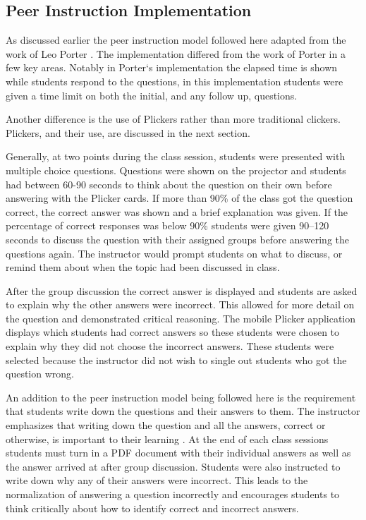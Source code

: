 \documentclass[12pt]{article}
\begin{document}

\subsection{Peer Instruction Implementation}

As discussed earlier the peer instruction model followed here adapted from the work of Leo Porter \cite{porterPeerInstructionStudents2011}. The implementation differed from the work of Porter in a few key areas. Notably in Porter`s implementation the elapsed time is shown while students respond to the questions, in this implementation students were given a time limit on both the initial, and any follow up, questions. 

Another difference is the use of Plickers rather than more traditional clickers. Plickers, and their use, are discussed in the next section.

Generally, at two points during the class session, students were presented with multiple choice questions. Questions were shown on the projector and students had between 60-90 seconds to think about the question on their own before answering with the Plicker cards. If more than 90\% of the class got the question correct, the correct answer was shown and a brief explanation was given. If the percentage of correct responses was below 90\% students were given 90–120 seconds to discuss the question with their assigned groups before answering the questions again. The instructor would prompt students on what to discuss, or remind them about when the topic had been discussed in class. 

After the group discussion the correct answer is displayed and students are asked to explain why the other answers were incorrect. This allowed for more detail on the question and demonstrated critical reasoning. The mobile Plicker application displays which students had correct answers so these students were chosen to explain why they did not choose the incorrect answers. These students were selected because the instructor did not wish to single out students who got the question wrong.

An addition to the peer instruction model being followed here is the requirement that students write down the questions and their answers to them. The instructor emphasizes that writing down the question and all the answers, correct or otherwise, is important to their learning \cite{metcalfeMemoryTruthCorrecting2019}. At the end of each class sessions students must turn in a PDF document with their individual answers as well as the answer arrived at after group discussion. Students were also instructed to write down why any of their answers were incorrect. This leads to the normalization of answering a question incorrectly and encourages students to think critically about how to identify correct and incorrect answers.
\end{document}
